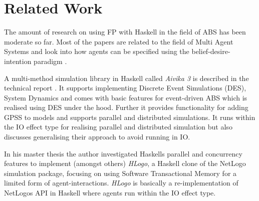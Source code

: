 \section{Related Work}
\label{sec:related_work}

The amount of research on using FP with Haskell in the field of ABS has been moderate so far. Most of the papers are related to the field of Multi Agent Systems and look into how agents can be specified using the belief-desire-intention paradigm \cite{de_jong_suitability_2014,sulzmann_specifying_2007,jankovic_functional_2007}.

A multi-method simulation library in Haskell called \textit{Aivika 3} is described in the technical report \cite{sorokin_aivika_2015}. It supports implementing Discrete Event Simulations (DES), System Dynamics and comes with basic features for event-driven ABS which is realised using DES under the hood. Further it provides functionality for adding GPSS to models and supports parallel and distributed simulations. It runs within the IO effect type for realising parallel and distributed simulation but also discusses generalising their approach to avoid running in IO.

In his master thesis \cite{bezirgiannis_improving_2013} the author investigated Haskells parallel and concurrency features to implement (amongst others) \textit{HLogo}, a Haskell clone of the NetLogo simulation package, focusing on using Software Transactional Memory for a limited form of agent-interactions. \textit{HLogo} is basically a re-implementation of NetLogos API in Haskell where agents run within the IO effect type.


